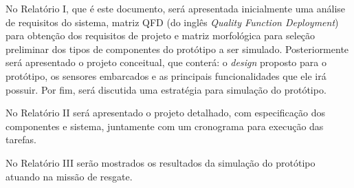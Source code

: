 No Relatório I, que é este documento, será apresentada inicialmente uma análise de requisitos do sistema, matriz QFD (do inglês \textit{Quality Function Deployment}) para obtenção dos requisitos de projeto e matriz morfológica para seleção preliminar dos tipos de componentes do protótipo a ser simulado. Posteriormente será apresentado o projeto conceitual, que conterá: o \textit{design} proposto para o protótipo, os sensores embarcados e as principais funcionalidades que ele irá possuir. Por fim, será discutida uma estratégia para simulação do protótipo.

No Relatório II será apresentado o projeto detalhado, com especificação dos componentes e sistema, juntamente com um cronograma para execução das tarefas.

No Relatório III serão mostrados os resultados da simulação do protótipo atuando na missão de resgate.